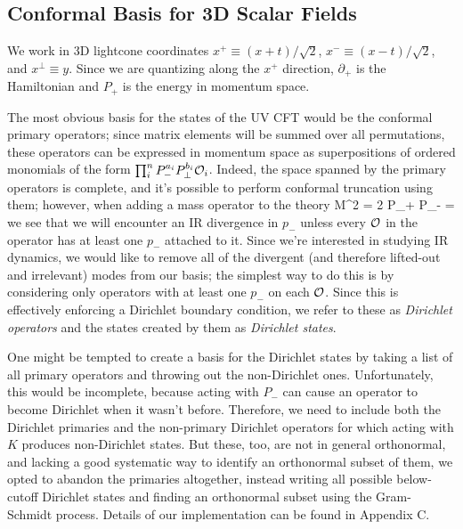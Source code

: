 

\subsection{Conformal Basis for 3D Scalar Fields}

We work in 3D lightcone coordinates $x^+ \equiv (x + t)/\sqrt{2}$, 
$x^- \equiv (x - t)/\sqrt{2}$, and $x^\perp \equiv y$. Since we are quantizing 
along the $x^+$ direction, $\partial_+$ is the Hamiltonian and $P_+$ is the 
energy in momentum space. 

The most obvious basis for the states of the UV CFT would be the conformal 
primary operators; since matrix elements will be summed over all permutations, 
these operators can be expressed in momentum space as superpositions of ordered 
monomials of the form $\prod_i^n P_-^{a_i} P_\perp^{b_i} {\cal O}_i$. Indeed, the 
space spanned by the primary operators is complete, and it's possible to perform 
conformal truncation using them; however, when adding a mass operator to the 
theory
\be
M^2 = 2 P_+ P_- = 
\ee
we see that we will encounter an IR divergence in $p_-$ unless every ${\cal O}$ in 
the operator has at least one $p_-$ attached to it. Since we're interested in 
studying IR dynamics, we would like to remove all of the divergent (and 
therefore lifted-out and irrelevant) modes from our basis; the simplest way to 
do this is by considering only operators with at least one $p_-$ on each 
${\cal O}$. Since this is effectively enforcing a Dirichlet boundary condition, we 
refer to these as \emph{Dirichlet operators} and the states created by them as 
\emph{Dirichlet states}.

One might be tempted to create a basis for the Dirichlet states by taking a list
of all primary operators and throwing out the non-Dirichlet ones. Unfortunately,
this would be incomplete, because acting with $P_-$ can cause an operator to
become Dirichlet when it wasn't before. Therefore, we need to include both the
Dirichlet primaries and the non-primary Dirichlet operators for which acting
with $K$ produces non-Dirichlet states. But these, too, are not in general 
orthonormal, and lacking a good systematic way to identify an orthonormal 
subset of them, we opted to abandon the primaries altogether, instead writing
all possible below-cutoff Dirichlet states and finding an orthonormal subset
using the Gram-Schmidt process. Details of our implementation can be found in 
Appendix C.


